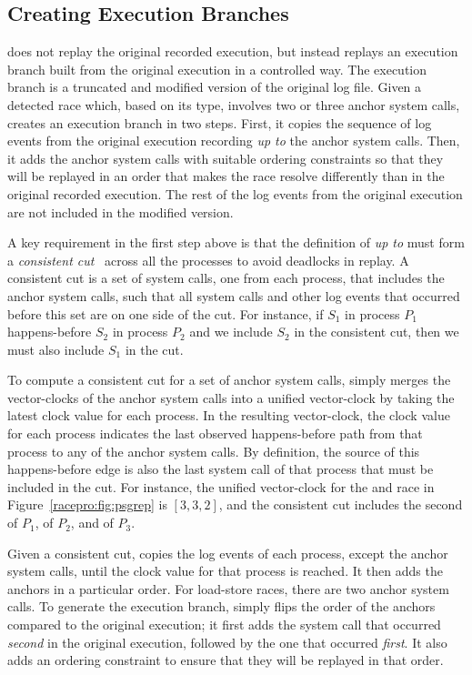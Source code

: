 \subsection{Creating Execution Branches}  \label{racepro:sec:branches}

\racepro does not replay the original recorded execution, but
instead replays an execution branch built from the original execution
in a controlled way. The execution branch is a truncated and modified
version of the original log file.  Given a detected race which, based
on its type, involves two or three anchor system calls, \racepro creates an
execution branch in two steps.  First, it copies the sequence of
log events from the original execution recording \emph{up to} the anchor
system calls.  Then, it adds the anchor system calls with suitable
ordering constraints so that they will be replayed in an order that makes
the race resolve differently than in the original recorded execution.
The rest of the log events from the original execution are not
included in the modified version.

A key requirement in the first step above is that the definition of
\emph{up to} must form a \emph{consistent cut}~\cite{vectorclock}
across all the processes to avoid deadlocks in replay.  A consistent
cut is a set of system calls, one from each process, that includes the
anchor system calls, such that all system calls and other log events
that occurred before this set are on one side of the cut.  For
instance, if $S_1$ in process $P_1$ happens-before $S_2$ in process
$P_2$ and we include $S_2$ in the consistent cut, then we must also
include $S_1$ in the cut.

To compute a consistent cut for a set of anchor system calls,
\racepro simply merges the vector-clocks of the anchor system calls into
a unified vector-clock by taking the latest clock value for each
process.  In the resulting vector-clock, the clock value for each
process indicates the last observed happens-before path from that process
to any of the anchor system calls.  By definition, the source of this
happens-before edge is also the last system call of that process that must
be included in the cut.  For instance, the unified vector-clock for the
 and 
race in Figure~\ref{racepro:fig:psgrep} is $[3,3,2]$, and the consistent cut
includes the second  of $P_1$,  of $P_2$, and
 of $P_3$.

Given a consistent cut, \racepro copies the log events of each process,
except the anchor system calls, until the clock value for that process
is reached.  It then adds the anchors in a particular order.  For
load-store races, there are two anchor system calls.  To generate the
execution branch, \racepro simply flips the order of the anchors compared
to the original execution; it first adds the system call that occurred
\emph{second} in the original execution, followed by the one that
occurred \emph{first}. It also adds an ordering constraint to ensure
that they will be replayed in that order. 


